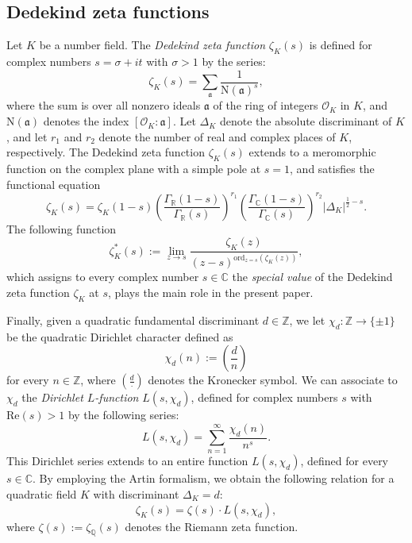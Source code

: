 \documentclass[10pt,a4paper]{amsart}
\theoremstyle{plain}
\theoremstyle{definition}
\theoremstyle{remark}
\newcommand{\R}{\mathbb{R}}
\newcommand{\C}{\mathbb{C}}
\begin{document}
\subsection{Dedekind zeta functions}
\label{sec:notation_dedekind}
Let $K$ be a number field. The \textit{Dedekind zeta function} $\zeta_K(s)$ is defined for complex numbers $s = \sigma + i t$ with $\sigma > 1$ by the series:
\begin{equation}\label{dfn Dedekind}
\zeta_K(s) = \sum_{\mathfrak{a}} \frac{1}{\mathrm{N}(\mathfrak{a})^s},
\end{equation}
where the sum is over all nonzero ideals $\mathfrak{a}$ of the ring of integers $\mathcal{O}_K$ in $K$, and $\mathrm{N}(\mathfrak{a})$ denotes the index $[\mathcal{O}_K\colon\mathfrak{a}]$. 
Let $\Delta_K$ denote the absolute discriminant of $K$, and let $r_1$ and $r_2$ denote the number of real and complex places of $K$, respectively. 
The Dedekind zeta function $\zeta_K(s)$ extends to a meromorphic function on the complex plane with a simple pole at $s = 1$, and satisfies the functional equation
\begin{equation}\label{functional equation}
\zeta_K(s) = \zeta_K(1 - s)
\left( \frac{\Gamma_\R(1 - s)}{\Gamma_\R(s)} \right)^{r_1} \left( \frac{\Gamma_\C(1 - s)}{\Gamma_\C(s)} \right)^{r_2} |\Delta_K|^{\frac{1}{2}-s}.
\end{equation}
The following function
\[
\zeta_K^{*}(s) := \lim_{z \to s} \frac{\zeta_K(z)}{(z-s)^{\mathrm{ord}_{z=s}(\zeta_K(z))}},
\]
which assigns to every complex number $s \in \mathbb{C}$ the \textit{special value} of the Dedekind zeta function $\zeta_K$ at $s$, plays the main role in the present paper.

Finally, given a quadratic fundamental discriminant $d \in \mathbb{Z}$, we let $\chi_d \colon \mathbb{Z} \to \{\pm 1\}$ be the quadratic Dirichlet character defined as 
\[
    \chi_d(n) := \left( \frac{d}{n} \right)
\]
for every $n \in \mathbb{Z}$, where $\left( \frac{d}{\cdot} \right)$ denotes the Kronecker symbol. We can associate to $\chi_d$ the \textit{Dirichlet $L$-function} $L(s,\chi_d)$, defined for complex numbers $s$ with $\mathrm{Re}(s) > 1$ by the following series:
\begin{equation}\label{dfn L Dirichlet}
L(s,\chi_d) = \sum_{n=1}^\infty \frac{\chi_d(n)}{n^s}.
\end{equation}
This Dirichlet series extends to an entire function $L(s,\chi_d)$, defined for every $s \in \mathbb{C}$. By employing the Artin formalism, we obtain the following relation for a quadratic field $K$ with discriminant $\Delta_K = d$:
\[
\zeta_K(s) = \zeta(s) \cdot L(s,\chi_d),
\]
where $\zeta(s) := \zeta_\mathbb{Q}(s)$ denotes the Riemann zeta function.
\end{document}
